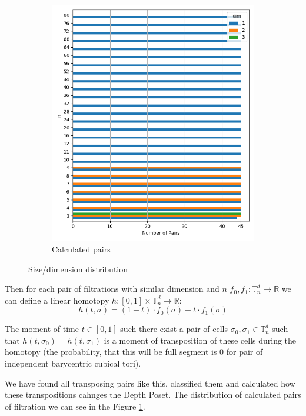 \documentclass{article}
\begin{document}
\begin{figure}[htbp]
\begin{subfigure}[t]{0.45\textwidth}
        \includegraphics[width=\textwidth]{pics/torus-transpositions/distribution.png}
        \caption{Calculated pairs}
        \label{fig:pairs_distribution}
    \end{subfigure}
    \caption{Size/dimension distribution}
    \label{fig:distribution}
\end{figure}

\par Then for each pair of filtrations with similar dimension and $n$ $f_0, f_1:\mathbb{T}^d_n \to \mathbb{R}$ we can define a linear homotopy $h: [0, 1]\times\mathbb{T}^d_n \to \mathbb{R}$:
$$
    h(t, \sigma) = (1 - t)\cdot f_0(\sigma) + t\cdot f_1(\sigma)
$$

\par The moment of time $t\in [0, 1]$ such there exist a pair of cells $\sigma_0, \sigma_1\in\mathbb{T}^d_n$ such that $h(t, \sigma_0) = h(t, \sigma_1)$ is a moment of transposition of these cells during the homotopy (the probability, that this will be full segment is 0 for pair of independent barycentric cubical tori).
\par We have found all transposing pairs like this, classified them and calculated how these transpositions cahnges the Depth Poset. The distribution of calculated pairs of filtration we can see in the Figure \ref{fig:pairs_distribution}.
\end{document}
